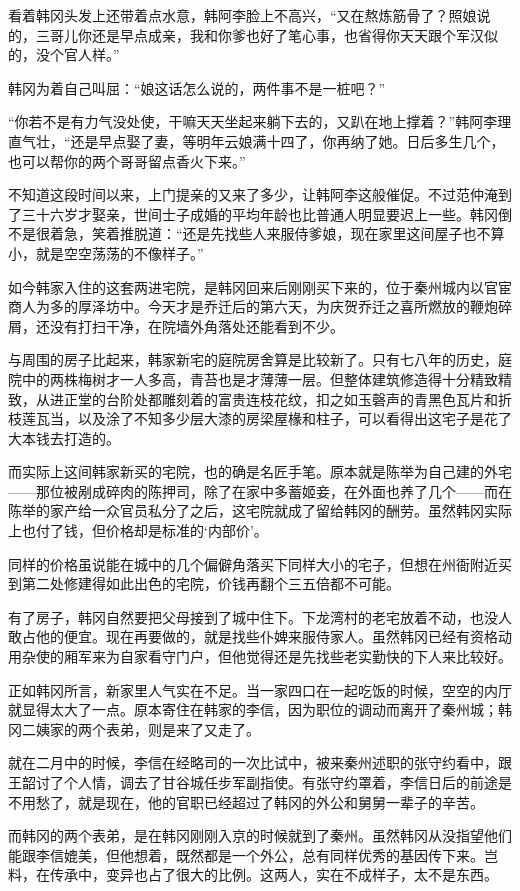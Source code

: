 看着韩冈头发上还带着点水意，韩阿李脸上不高兴，“又在熬炼筋骨了？照娘说的，三哥儿你还是早点成亲，我和你爹也好了笔心事，也省得你天天跟个军汉似的，没个官人样。”

韩冈为着自己叫屈：“娘这话怎么说的，两件事不是一桩吧？”

“你若不是有力气没处使，干嘛天天坐起来躺下去的，又趴在地上撑着？”韩阿李理直气壮，“还是早点娶了妻，等明年云娘满十四了，你再纳了她。日后多生几个，也可以帮你的两个哥哥留点香火下来。”

不知道这段时间以来，上门提亲的又来了多少，让韩阿李这般催促。不过范仲淹到了三十六岁才娶亲，世间士子成婚的平均年龄也比普通人明显要迟上一些。韩冈倒不是很着急，笑着推脱道：“还是先找些人来服侍爹娘，现在家里这间屋子也不算小，就是空空荡荡的不像样子。”

如今韩家入住的这套两进宅院，是韩冈回来后刚刚买下来的，位于秦州城内以官宦商人为多的厚泽坊中。今天才是乔迁后的第六天，为庆贺乔迁之喜所燃放的鞭炮碎屑，还没有打扫干净，在院墙外角落处还能看到不少。

与周围的房子比起来，韩家新宅的庭院房舍算是比较新了。只有七八年的历史，庭院中的两株梅树才一人多高，青苔也是才薄薄一层。但整体建筑修造得十分精致精致，从进正堂的台阶处都雕刻着的富贵连枝花纹，扣之如玉磬声的青黑色瓦片和折枝莲瓦当，以及涂了不知多少层大漆的房梁屋椽和柱子，可以看得出这宅子是花了大本钱去打造的。

而实际上这间韩家新买的宅院，也的确是名匠手笔。原本就是陈举为自己建的外宅——那位被剐成碎肉的陈押司，除了在家中多蓄姬妾，在外面也养了几个——而在陈举的家产给一众官员私分了之后，这宅院就成了留给韩冈的酬劳。虽然韩冈实际上也付了钱，但价格却是标准的‘内部价’。

同样的价格虽说能在城中的几个偏僻角落买下同样大小的宅子，但想在州衙附近买到第二处修建得如此出色的宅院，价钱再翻个三五倍都不可能。

有了房子，韩冈自然要把父母接到了城中住下。下龙湾村的老宅放着不动，也没人敢占他的便宜。现在再要做的，就是找些仆婢来服侍家人。虽然韩冈已经有资格动用杂使的厢军来为自家看守门户，但他觉得还是先找些老实勤快的下人来比较好。

正如韩冈所言，新家里人气实在不足。当一家四口在一起吃饭的时候，空空的内厅就显得太大了一点。原本寄住在韩家的李信，因为职位的调动而离开了秦州城；韩冈二姨家的两个表弟，则是来了又走了。

就在二月中的时候，李信在经略司的一次比试中，被来秦州述职的张守约看中，跟王韶讨了个人情，调去了甘谷城任步军副指使。有张守约罩着，李信日后的前途是不用愁了，就是现在，他的官职已经超过了韩冈的外公和舅舅一辈子的辛苦。

而韩冈的两个表弟，是在韩冈刚刚入京的时候就到了秦州。虽然韩冈从没指望他们能跟李信媲美，但他想着，既然都是一个外公，总有同样优秀的基因传下来。岂料，在传承中，变异也占了很大的比例。这两人，实在不成样子，太不是东西。


